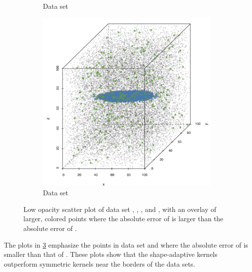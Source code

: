 \begin{figure}
\begin{subfigure}{0.23\textwidth}
				\caption{Data set \baakmanFour}
				\label{fig:discussion:performance:mbeLowerError:baakman4}
			\end{subfigure}		
			\begin{subfigure}{0.23\textwidth}
				\centering
				\includegraphics[keepaspectratio=true, width=\textwidth, height=0.23\textheight]{discussion/img/baakman_5_abs_error_mbeSmallerThansambe}
				\caption{Data set \baakmanFive}
				\label{fig:discussion:performance:mbeLowerError:baakman5}
			\end{subfigure}			
			\caption{Low opacity scatter plot of data set %
				 \ferdosiOne, %
				 \baakmanOne, %
				 \baakmanFour, and %
				 \baakmanFive, %
				with an overlay of larger, colored points where the absolute error of \sambe is larger than the absolute error of \mbe.}
			\label{fig:discussion:performance:singleSphere:mbeLowerError}
		\end{figure}
		The plots in \cref{fig:discussion:performance:singleSphere:mbeLowerError} emphasize the points in data set \ferdosiOne and \baakmanOne where the absolute error of \mbe is smaller than that of \sambe. These plots show that the shape-adaptive kernels outperform symmetric kernels near the borders of the data sets.
